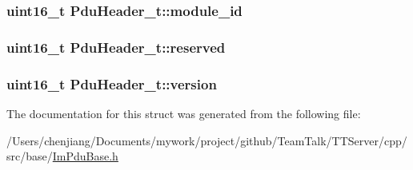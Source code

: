 \subsubsection[{module\+\_\+id}]{\setlength{\rightskip}{0pt plus 5cm}uint16\+\_\+t Pdu\+Header\+\_\+t\+::module\+\_\+id}\label{struct_pdu_header__t_a96ed27c9baa44e30a09c07701c3a21fb}
\hypertarget{struct_pdu_header__t_a350b4452cd807d100cb5e3c22bf639fb}{}
\subsubsection[{reserved}]{\setlength{\rightskip}{0pt plus 5cm}uint16\+\_\+t Pdu\+Header\+\_\+t\+::reserved}\label{struct_pdu_header__t_a350b4452cd807d100cb5e3c22bf639fb}
\hypertarget{struct_pdu_header__t_ab71a8e7c6ba0c24544c9cda6809c4497}{}
\subsubsection[{version}]{\setlength{\rightskip}{0pt plus 5cm}uint16\+\_\+t Pdu\+Header\+\_\+t\+::version}\label{struct_pdu_header__t_ab71a8e7c6ba0c24544c9cda6809c4497}


The documentation for this struct was generated from the following file\+:\begin{DoxyCompactItemize}
\item 
/\+Users/chenjiang/\+Documents/mywork/project/github/\+Team\+Talk/\+T\+T\+Server/cpp/src/base/\hyperlink{_im_pdu_base_8h}{Im\+Pdu\+Base.\+h}\end{DoxyCompactItemize}
